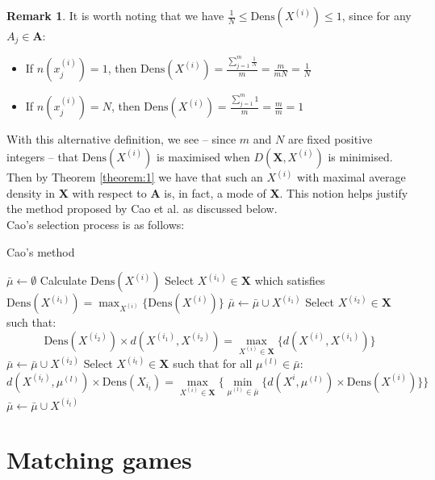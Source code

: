 \documentclass{article}
\theoremstyle{definition}
\newtheorem*{remark}{Remark}
\begin{document}
\begin{remark}
	It is worth noting that we have $ \frac{1}{N} \leq \text{Dens}(X^{(i)})
	\leq 1$, since for any $A_j \in \textbf{A}$:		
	\begin{itemize}	
		\item If $n(x_j^{(i)}) = 1$, then $\text{Dens}(X^{(i)}) = 
			\frac{\sum_{j=1}^m \frac{1}{N}}{m} = \frac{m}{mN} = 
			\frac{1}{N}$
		\item If $n(x_j^{(i)}) = N$, then $\text{Dens}(X^{(i)}) = 
			\frac{\sum_{j=1}^m 1}{m} = \frac{m}{m} = 1$
	\end{itemize}
\end{remark}

With this alternative definition, we see -- since $m$ and $N$ are fixed positive
integers -- that $\text{Dens}(X^{(i)})$ is maximised when $D(\textbf{X}, 
X^{(i)})$ is minimised. Then by Theorem \ref{theorem:1} we have that such an 
$X^{(i)}$ with maximal average density in \textbf{X} with respect to \textbf{A}
is, in fact, a mode of \textbf{X}. This notion helps justify the method proposed
by Cao et al. as discussed below.\\

Cao's selection process is as follows:

\begin{algorithm}[H]
\caption{Cao's method}\label{alg:cao}
	\begin{algorithmic}[0]
		\State $\bar{\mu} \gets \emptyset$
			\State Calculate $\text{Dens}(X^{(i)})$
		\EndFor
		\State Select $X^{(i_1)} \in \textbf{X}$ which satisfies 
			$\text{Dens}(X^{(i_1)}) = 
			\max_{X^{(i)}} \{\text{Dens}(X^{(i)})\}$
		\State $\bar{\mu} \gets \bar{\mu} \cup X^{(i_1)}$
		\State Select $X^{(i_2)} \in \textbf{X}$ such that: 
		\[
			\text{Dens}(X^{(i_2)}) \times d(X^{(i_1)}, X^{(i_2)}) =
			\max_{X^{(i)} \in \textbf{X}} \{d(X^{(i)}, X^{(i_1)})\}
		\]
		\State $\bar{\mu} \gets \bar{\mu} \cup X^{(i_2)}$
			\State Select $X^{(i_t)} \in \textbf{X}$ such that for 
				all $\mu^{(l)} \in \bar{\mu}$:
			\[
				d(X^{(i_t)}, \mu^{(l)}) \times 
				\text{Dens}(X_{i_t}) = \max_{X^{(i)} \in 
				\textbf{X}} \{ \min_{\mu^{(l)} \in \bar{\mu}} 
					\{d(X^{i}, \mu^{(l)}) \times 
					\text{Dens}(X^{(i)}) \} \}
			\]
			\State $\bar{\mu} \gets \bar{\mu} \cup X^{(i_t)}$
		\EndWhile
	\end{algorithmic}
\end{algorithm}

\section{Matching games}\label{section:matching}
\end{document}
